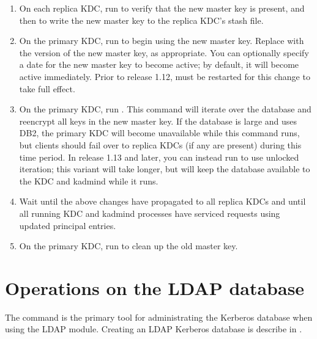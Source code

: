 \documentclass[letterpaper,10pt,english]{sphinxmanual}
\begin{document}
\begin{enumerate}
\item {} 
\sphinxAtStartPar
On each replica KDC, run  to verify that
the new master key is present, and then  to
write the new master key to the replica KDC’s stash file.

\item {} 
\sphinxAtStartPar
On the primary KDC, run  to begin using the
new master key.  Replace  with the version of the new master
key, as appropriate.  You can optionally specify a date for the new
master key to become active; by default, it will become active
immediately.  Prior to release 1.12, {\hyperref[\detokenize{admin/admin_commands/kadmind:kadmind-8}]{}} must be
restarted for this change to take full effect.

\item {} 
\sphinxAtStartPar
On the primary KDC, run .
This command will iterate over the database and re\sphinxhyphen{}encrypt all keys
in the new master key.  If the database is large and uses DB2, the
primary KDC will become unavailable while this command runs, but
clients should fail over to replica KDCs (if any are present)
during this time period.  In release 1.13 and later, you can
instead run  to
use unlocked iteration; this variant will take longer, but will
keep the database available to the KDC and kadmind while it runs.

\item {} 
\sphinxAtStartPar
Wait until the above changes have propagated to all replica KDCs
and until all running KDC and kadmind processes have serviced
requests using updated principal entries.

\item {} 
\sphinxAtStartPar
On the primary KDC, run  to clean up the
old master key.

\end{enumerate}


\section{Operations on the LDAP database}
\label{\detokenize{admin/database:operations-on-the-ldap-database}}\label{\detokenize{admin/database:ops-on-ldap}}
\sphinxAtStartPar
The {\hyperref[\detokenize{admin/admin_commands/kdb5_ldap_util:kdb5-ldap-util-8}]{}} command is the primary tool for
administrating the Kerberos database when using the LDAP module.
Creating an LDAP Kerberos database is describe in {\hyperref[\detokenize{admin/conf_ldap:conf-ldap}]{}}.
\end{document}
